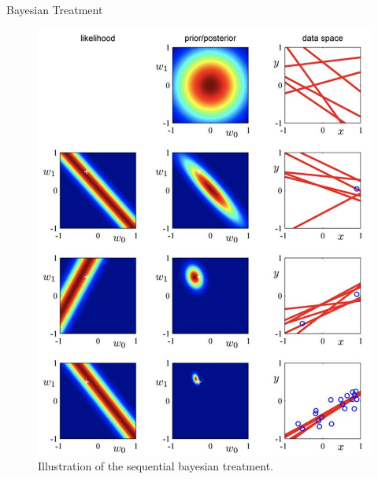 \documentclass{bredelebeamer}
\begin{document}
\begin{frame}{Bayesian Treatment}
  \begin{figure}
  \centering
  \includegraphics[scale=0.25]{bayesian_treatment.png}
  \caption{
    Illustration of the sequential bayesian treatment.
  }
  \end{figure}
\end{frame}
\end{document}
